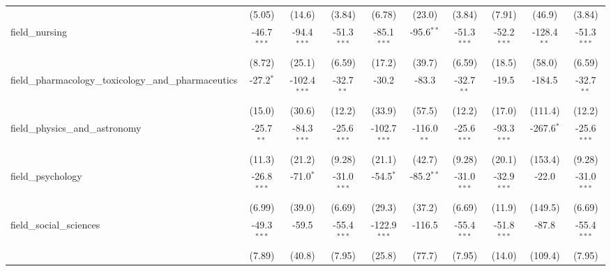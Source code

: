 \begin{tabular}{lccccccccc}
                                                               & (5.05)         & (14.6)         & (3.84)        & (6.78)         & (23.0)         & (3.84)        & (7.91)         & (46.9)         & (3.84)\\   
   field\_nursing                                              & -46.7$^{***}$  & -94.4$^{***}$  & -51.3$^{***}$ & -85.1$^{***}$  & -95.6$^{**}$   & -51.3$^{***}$ & -52.2$^{***}$  & -128.4$^{**}$  & -51.3$^{***}$\\   
                                                               & (8.72)         & (25.1)         & (6.59)        & (17.2)         & (39.7)         & (6.59)        & (18.5)         & (58.0)         & (6.59)\\   
   field\_pharmacology\_toxicology\_and\_pharmaceutics         & -27.2$^{*}$    & -102.4$^{***}$ & -32.7$^{**}$  & -30.2          & -83.3          & -32.7$^{**}$  & -19.5          & -184.5         & -32.7$^{**}$\\   
                                                               & (15.0)         & (30.6)         & (12.2)        & (33.9)         & (57.5)         & (12.2)        & (17.0)         & (111.4)        & (12.2)\\   
   field\_physics\_and\_astronomy                              & -25.7$^{**}$   & -84.3$^{***}$  & -25.6$^{***}$ & -102.7$^{***}$ & -116.0$^{**}$  & -25.6$^{***}$ & -93.3$^{***}$  & -267.6$^{*}$   & -25.6$^{***}$\\   
                                                               & (11.3)         & (21.2)         & (9.28)        & (21.1)         & (42.7)         & (9.28)        & (20.1)         & (153.4)        & (9.28)\\   
   field\_psychology                                           & -26.8$^{***}$  & -71.0$^{*}$    & -31.0$^{***}$ & -54.5$^{*}$    & -85.2$^{**}$   & -31.0$^{***}$ & -32.9$^{***}$  & -22.0          & -31.0$^{***}$\\   
                                                               & (6.99)         & (39.0)         & (6.69)        & (29.3)         & (37.2)         & (6.69)        & (11.9)         & (149.5)        & (6.69)\\   
   field\_social\_sciences                                     & -49.3$^{***}$  & -59.5          & -55.4$^{***}$ & -122.9$^{***}$ & -116.5         & -55.4$^{***}$ & -51.8$^{***}$  & -87.8          & -55.4$^{***}$\\   
                                                               & (7.89)         & (40.8)         & (7.95)        & (25.8)         & (77.7)         & (7.95)        & (14.0)         & (109.4)        & (7.95)\\   

\end{tabular}
